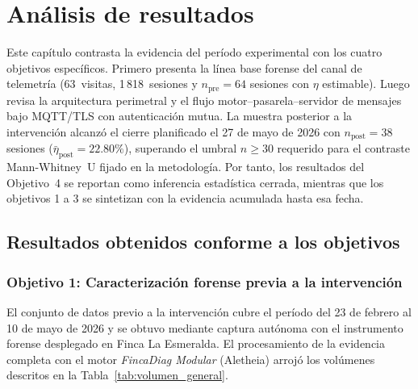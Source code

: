 \chapter{Análisis de resultados}
\label{chapter:chapter06}
Este capítulo contrasta la evidencia del período experimental con los cuatro objetivos específicos. Primero presenta la línea base forense del canal de telemetría (63~visitas, 1\,818~sesiones y $n_{\text{pre}}=64$ sesiones con $\eta$ estimable). Luego revisa la arquitectura perimetral y el flujo motor--pasarela--servidor de mensajes bajo \ac{MQTT}/\ac{TLS} con autenticación mutua. La muestra posterior a la intervención alcanzó el cierre planificado el 27 de mayo de 2026 con $n_{\text{post}}=38$ sesiones ($\bar{\eta}_{\text{post}}=22.80\%$), superando el umbral $n\geq30$ requerido para el contraste Mann-Whitney~U fijado en la metodología. Por tanto, los resultados del Objetivo~4 se reportan como inferencia estadística cerrada, mientras que los objetivos 1 a 3 se sintetizan con la evidencia acumulada hasta esa fecha.

\section{Resultados obtenidos conforme a los objetivos}
\subsection{Objetivo 1: Caracterización forense previa a la intervención}
\label{sec:obj1-resultados}

El conjunto de datos previo a la intervención cubre el período del 23 de febrero al 10 de mayo de 2026 y se obtuvo mediante captura autónoma con el instrumento forense desplegado en Finca La Esmeralda. El procesamiento de la evidencia completa con el motor \textit{FincaDiag Modular} (Aletheia) arrojó los volúmenes descritos en la Tabla~\ref{tab:volumen_general}.

